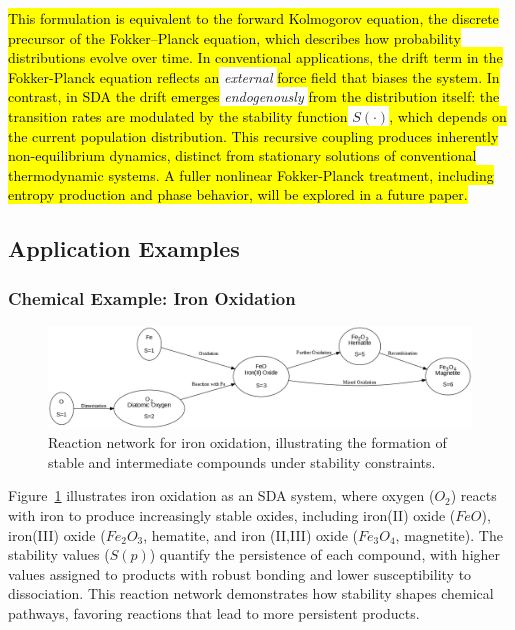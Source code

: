 \documentclass[preprint,12pt]{elsarticle}
\newcommand{\added}[1]{\hl{#1}}
\begin{document}
\added{This formulation is equivalent to the forward Kolmogorov equation, the discrete precursor of the Fokker--Planck equation, which describes how probability distributions evolve over time. In conventional applications, the drift term in the Fokker-Planck equation reflects an} \emph{external} \added{force field that biases the system. In contrast, in SDA the drift emerges} \emph{endogenously} \added{from the distribution itself: the transition rates are modulated by the stability function} \(S(\cdot)\)\added{, which depends on the current population distribution. 
This recursive coupling produces inherently non-equilibrium dynamics, distinct from stationary solutions of conventional thermodynamic systems. A fuller nonlinear Fokker-Planck treatment, including entropy production and phase behavior, will be explored in a future paper.}


\subsection{Application Examples}



\subsubsection{Chemical Example: Iron Oxidation}

\begin{figure}[h]
    \centering
    \includegraphics[width=1\textwidth,height=0.3\textwidth]{figure_13.png}
    \caption{Reaction network for iron oxidation, illustrating the formation of stable and intermediate compounds under stability constraints.}
    \label{fig:figure_13}
\end{figure}

Figure~\ref{fig:figure_13} illustrates iron oxidation as an SDA system, where oxygen (\(O_2\)) reacts with iron to produce increasingly stable oxides, including iron(II) oxide (\(FeO\)), iron(III) oxide (\(Fe_2O_3\), hematite, and iron (II,III) oxide (\(Fe_3O_4\), magnetite). The stability values (\(S(p)\)) quantify the persistence of each compound, with higher values assigned to products with robust bonding and lower susceptibility to dissociation. This reaction network demonstrates how stability shapes chemical pathways, favoring reactions that lead to more persistent products.
\end{document}

